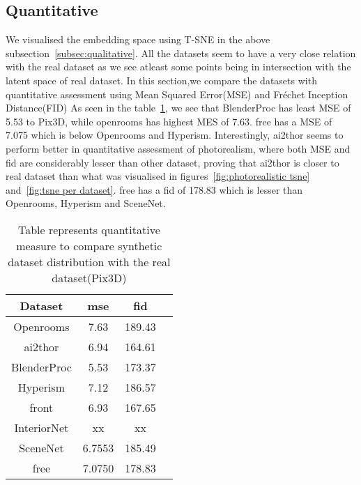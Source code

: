 \subsection{Quantitative}\label{subsec:quantitative}

We visualised the embedding space using T-SNE in the above subsection~\ref{subsec:qualitative}.
All the datasets seem to have a very close relation with the real dataset as we see atleast some points being in intersection with the latent space of real dataset.
In this section,we compare the datasets with quantitative assessment using Mean Squared Error(MSE) and Fr\'echet Inception Distance(FID)
As seen in the table~\ref{tab:quantitative-dataset-comparison}, we see that BlenderProc has least MSE of 5.53 to Pix3D,
while openrooms has highest MES of 7.63.
\gls{free} has a MSE of 7.075 which is below Openrooms and Hyperism.
Interestingly, \gls{ai2thor} seems to perform better in quantitative assessment of photorealism,
where both MSE and \gls{fid} are considerably lesser than other dataset,
proving that \gls{ai2thor} is closer to real dataset than what was visualised in figures~\ref{fig:photorealistic tsne} and~\ref{fig:tsne per dataset}.
\gls{free} has a \gls{fid} of 178.83 which is lesser than Openrooms, Hyperism and SceneNet.

\begin{table}[ht]
    \centering
    \begin{tabular}{|c |c |c |c|}
        \hline
        Dataset & \gls{mse} & \gls{fid} \\ [0.5ex]
        \hline\hline
        Openrooms & 7.63 & 189.43 \\
        \hline
        \Gls{ai2thor} & 6.94 & 164.61 \\
        \hline
        BlenderProc & 5.53 & 173.37 \\
        \hline
        Hyperism & 7.12 & 186.57 \\
        \hline
        \Gls{front} & 6.93 & 167.65 \\
        \hline
        InteriorNet & xx & xx \\
        \hline
        SceneNet & 6.7553 & 185.49 \\
        \hline
        \Gls{free} & 7.0750 & 178.83 \\[1ex]
        \hline
    \end{tabular}
    \caption{Table represents quantitative measure to compare synthetic dataset distribution with the real dataset(Pix3D)}
    \label{tab:quantitative-dataset-comparison}
\end{table}

